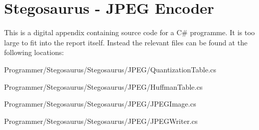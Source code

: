 \chapter{Stegosaurus - JPEG Encoder}
\label{app:B}
This is a digital appendix containing source code for a C\# programme. It is too large to fit into the report itself.
Instead the relevant files can be found at the following locations:

Programmer/Stegosaurus/Stegosaurus/JPEG/QuantizationTable.cs

Programmer/Stegosaurus/Stegosaurus/JPEG/HuffmanTable.cs

Programmer/Stegosaurus/Stegosaurus/JPEG/JPEGImage.cs

Programmer/Stegosaurus/Stegosaurus/JPEG/JPEGWriter.cs

%
%
%
%
